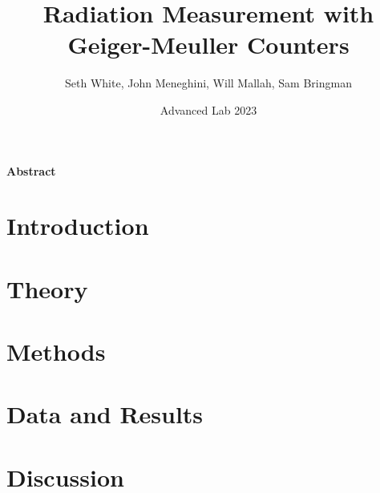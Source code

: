 \documentclass[12pt, letterpaper]{article}
\title{Radiation Measurement with Geiger-Meuller Counters}
\author{Seth White, John Meneghini, Will Mallah, Sam Bringman}
\date{Advanced Lab 2023}
\begin{document}
\maketitle

\begin{flushleft}
\textbf{Abstract}
\end{flushleft}

\newpage

\section{Introduction}



\section{Theory}



\section{Methods}



\section{Data and Results}



\section{Discussion}
\end{document}
